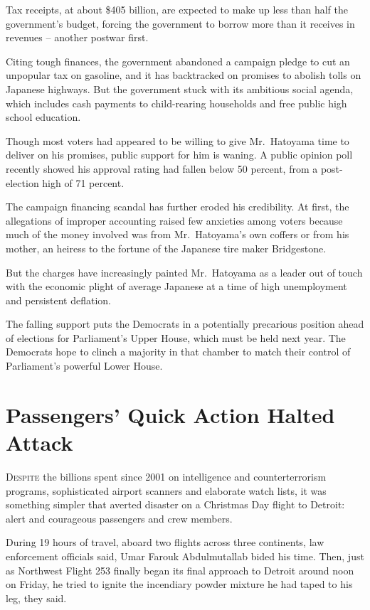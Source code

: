 ﻿\documentclass[12pt]{article}
\begin{document}
Tax receipts, at about \$405 billion, are expected to make up less than half the government's
budget, forcing the government to borrow more than it receives in revenues -- another postwar first.

Citing tough finances, the government abandoned a campaign pledge to cut an unpopular tax on
gasoline, and it has backtracked on promises to abolish tolls on Japanese highways. But the
government stuck with its ambitious social agenda, which includes cash payments to child-rearing
households and free public high school education.

Though most voters had appeared to be willing to give Mr.~Hatoyama time to deliver on his promises,
public support for him is waning. A public opinion poll recently showed his approval rating had
fallen below 50 percent, from a post-election high of 71 percent.

The campaign financing scandal has further eroded his credibility. At first, the allegations of
improper accounting raised few anxieties among voters because much of the money involved was from
Mr.~Hatoyama's own coffers or from his mother, an heiress to the fortune of the Japanese tire maker
Bridgestone.

But the charges have increasingly painted Mr.~Hatoyama as a leader out of touch with the economic
plight of average Japanese at a time of high unemployment and persistent deflation.

The falling support puts the Democrats in a potentially precarious position ahead of elections for
Parliament's Upper House, which must be held next year. The Democrats hope to clinch a majority in
that chamber to match their control of Parliament's powerful Lower House.

\section{Passengers' Quick Action Halted Attack}

\lettrine{D}{espite} the billions spent since 2001 on intelligence and
counterterrorism programs, sophisticated airport scanners and elaborate watch lists, it was
something simpler that averted disaster on a Christmas Day flight to Detroit: alert and courageous
passengers and crew members.

During 19 hours of travel, aboard two flights across three continents, law enforcement officials
said, Umar Farouk Abdulmutallab bided his time. Then, just as Northwest Flight 253 finally began its
final approach to Detroit around noon on Friday, he tried to ignite the incendiary powder mixture he
had taped to his leg, they said.
\end{document}
